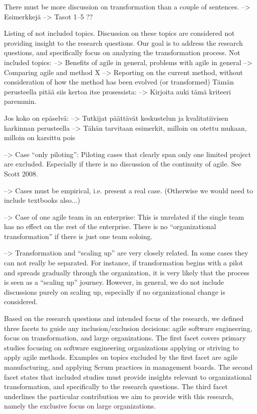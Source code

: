 \documentclass[preprint,authoryear,12pt]{elsarticle}
\begin{document}
There must be more discussion on transformation than a couple of sentences.
--> Esimerkkejä
--> Tasot 1--5 ??

Listing of not included topics. Discussion on these topics are considered not
providing insight to the research questions. Our goal is to address the research
questions, and specifically focus on analyzing the transformation process.
Not included topics:
--> Benefits of agile in general, problems with agile in general
--> Comparing agile and method X
--> Reporting on the current method, without consideration of how the method has
    been evolved (or transformed)
Tämän perusteella pitää siis kertoa itse prosessista: --> Kirjoita auki tämä
kriteeri paremmin.


Jos koko on epäselvä:
--> Tutkijat päättävät keskustelun ja kvalitatiivisen harkinnan perusteella
--> Tähän tarvitaan esimerkit, milloin on otettu mukaan, milloin on karsittu
    pois


--> Case ``only piloting'': Piloting cases that clearly span only one limited
    project are excluded. Especially if there is no discussion of the continuity
    of agile. See Scott 2008.


--> Cases must be empirical, i.e. present a real case. (Otherwise we would need
    to include textbooks also...)


--> Case of one agile team in an enterprise: This is unrelated if the single
    team has no effect on the rest of the enterprise. There is no
    ``organizational transformation'' if there is just one team soloing.  


--> Transformation and ``scaling up'' are very closely related. In some cases
    they can not really be separated. For instance, if transformation begins
    with a pilot and spreads gradually through the organization, it is very
    likely that the process is seen as a ``scaling up'' journey.
    However, in general, we do not include discussions purely on scaling up,
    especially if no organizational change is considered.



Based on the research questions and intended focus of the research, we defined
three facets to guide any inclusion/exclusion decisions: agile software
engineering, focus on transformation, and large organizations. The first facet covers primary studies
focusing on software engineering organizations applying or striving to apply
agile methods. Examples on topics excluded by the first facet are agile
manufacturing, and applying Scrum practices in management boards. The second
facet states that included studies must provide insights relevant to
organizational transformation, and specifically to the research questions.
The third facet underlines the particular contribution we aim to provide with
this research, namely the exclusive focus on large organizations.
\end{document}
